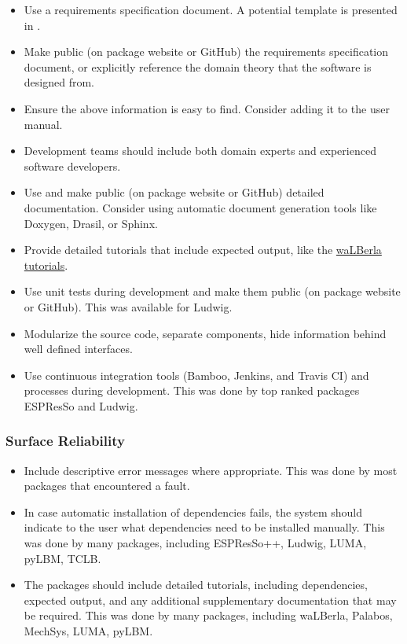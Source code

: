 \documentclass[12pt, notitlepage]{article}
\begin{document}
\begin{itemize}
	\item Use a requirements specification document. A potential template is presented in \citep{smith2005new}. 
	\item Make public (on package website or GitHub) the requirements specification document, or explicitly reference the domain theory that the software is designed from.
	\item Ensure the above information is easy to find. Consider adding it to the user manual. 
	\item Development teams should include both domain experts and experienced software developers.
	\item Use and make public (on package website or GitHub) detailed documentation. Consider using automatic document generation tools like Doxygen, Drasil, or Sphinx.
	\item Provide detailed tutorials that include expected output, like the \href{https://www.walberla.net/doxygen/index.html}{waLBerla tutorials}.
	\item Use unit tests during development and make them public (on package website or GitHub). This was available for Ludwig.
	\item Modularize the source code, separate components, hide information  behind well defined interfaces.
	\item Use continuous integration tools (Bamboo, Jenkins, and Travis CI) and processes during development. This was done by top ranked packages ESPResSo and Ludwig.
\end{itemize}

\subsubsection{Surface Reliability}

\begin{itemize}
	\item Include descriptive error messages where appropriate. This was done by most packages that encountered a fault.
	\item In case automatic installation of dependencies fails, the system should indicate to the user what dependencies need to be installed manually. This was done by many packages, including ESPResSo++, Ludwig, LUMA, pyLBM, TCLB.
	\item The packages should include detailed tutorials, including dependencies, expected output, and any additional supplementary documentation that may be required. This was done by many packages, including waLBerla, Palabos, MechSys, LUMA, pyLBM.
\end{itemize}
\end{document}
